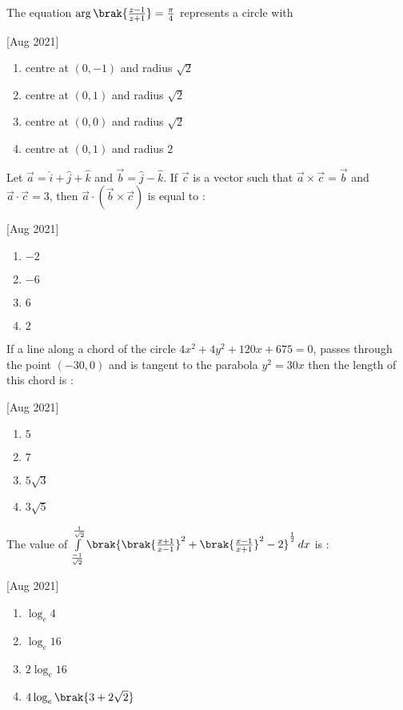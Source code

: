     \item The equation $\arg\brak{\frac{z-1}{z+1}}=\frac{\pi}{4}$ represents a circle with
    
    \hfill[Aug 2021]
        \begin{enumerate}
            \item centre at $(0,-1)$ and radius $\sqrt{2}$
            \item centre at $(0,1)$ and radius $\sqrt{2}$
            \item centre at $(0,0)$ and radius $\sqrt{2}$
            \item centre at $(0,1)$ and radius $2$
        \end{enumerate}

    \item Let $\vec{a}=\hat{i}+\hat{j}+\hat{k}$ and $\vec{b}=\hat{j}-\hat{k}$. If $\vec{c}$ is a vector such that $\vec{a}\times\vec{c}=\vec{b}$ and $\vec{a}\cdot\vec{c}=3$, then $\vec{a}\cdot(\vec{b}\times\vec{c})$ is equal to :
    
    \hfill[Aug 2021]
        \begin{enumerate}
            \item $-2$
            \item $-6$
            \item $6$
            \item $2$
        \end{enumerate}

    \item If a line along a chord of the circle $4x^2+4y^2+120x+675=0$, passes through the point $(-30, 0)$ and is tangent to the parabola $y^2 = 30x$ then the length of this chord is :
    
    \hfill[Aug 2021]
        \begin{enumerate}
            \item $5$
            \item $7$
            \item $5\sqrt{3}$
            \item $3\sqrt{5}$
        \end{enumerate}

    \item The value of $\int\limits_{\frac{-1}{\sqrt{2}}}^{\frac{1}{\sqrt{2}}}\brak{\brak{\frac{x+1}{x-1}}^2+\brak{\frac{x-1}{x+1}}^2-2}^{\frac{1}{2}}\,dx$ is :
    
    \hfill[Aug 2021]
        \begin{enumerate}
            \item $\log_{e}4$
            \item $\log_{e}16$
            \item $2\log_{e}16$
            \item $4\log_{e}\brak{3+2\sqrt{2}}$
        \end{enumerate}

